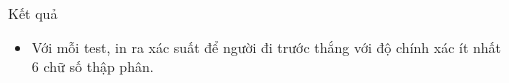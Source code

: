 Kết quả  
\begin{itemize}
	\item     Với mỗi test, in ra xác suất để người đi trước thắng với độ chính xác ít nhất 6 chữ số thập phân.   
\end{itemize}